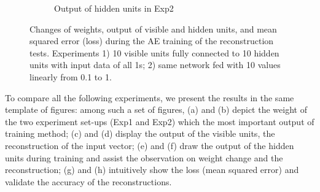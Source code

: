 \begin{figure}
\begin{subfigure}[t]{0.45\textwidth}
		\caption{Output of hidden units in Exp2}
	\end{subfigure}
	\caption{Changes of weights, output of visible and hidden units, and mean squared error (loss) during the AE training of the reconstruction tests. 
		Experiments 1) 10 visible units fully connected to 10 hidden units with input data of all 1s; 2) \protect{} same network fed with 10 values \protect{} \protect{} linearly from 0.1 to 1.}
	\label{fig:ae_orig}
\end{figure}

To compare all the following experiments, we present the results in the same template of figures:
among such a set of figures, (a) and (b) depict the weight \protect{} \protect{} of the two experiment set-ups (Exp1 and Exp2) which \protect{} \protect{} the most important output of \protect{} \protect{} training method;
(c) and (d) display the output of the visible units, the reconstruction of the input vector;
(e) and (f) draw the output of the hidden units during training and assist the observation on weight change and the reconstruction;
(g) and (h) intuitively show the loss (mean squared error) and validate the accuracy of the reconstructions.


